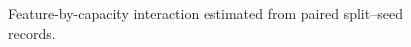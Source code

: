 \begin{figure}[!t]
\centering
{}
\caption{Feature-by-capacity interaction estimated from paired split--seed records.}
\label{fig:interaction-effects}
\end{figure}
